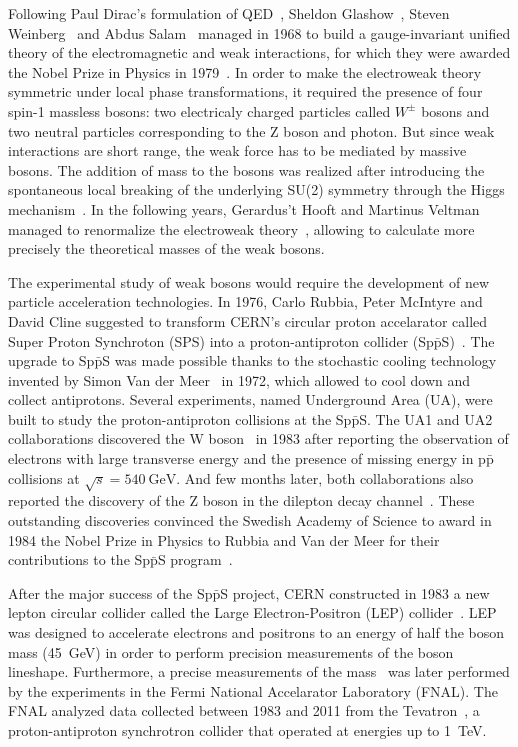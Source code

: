 Following Paul Dirac's formulation of QED~\cite{DiracQED}, Sheldon Glashow~\cite{Glashow:1959wxa}, Steven Weinberg~\cite{Weinberg:1967tq} and Abdus Salam~\cite{Salam:1968rm} managed in 1968 to build a gauge-invariant unified theory of the electromagnetic and weak interactions, for which they were awarded the Nobel Prize in Physics in 1979~\cite{Nobel1979}. In order to make the electroweak theory symmetric under local phase transformations, it required the presence of four spin-1 massless bosons: two electricaly charged particles called $W^{\pm}$ bosons and two neutral particles corresponding to the Z boson and photon. But since weak interactions are short range, the weak force has to be mediated by massive bosons. The addition of mass to the bosons was realized after introducing the spontaneous local breaking of the underlying SU(2) symmetry through the Higgs mechanism~\cite{HiggsMechanism_1,HiggsMechanism_2}. In the following years, Gerardus't Hooft and Martinus Veltman managed to renormalize the electroweak theory~\cite{Renormalization_1,Renormalization_2}, allowing to calculate more precisely the theoretical masses of the weak bosons.

The experimental study of weak bosons would require the development of new particle acceleration technologies. In 1976, Carlo Rubbia, Peter McIntyre and David Cline suggested to transform CERN's circular proton accelarator called Super Proton Synchroton (SPS) into a proton-antiproton collider (Sp$\bar{\mathrm{p}}$S)~\cite{SppS}. The upgrade to Sp$\bar{\mathrm{p}}$S was made possible thanks to the stochastic cooling technology invented by Simon Van der Meer~\cite{StochasticCooling} in 1972, which allowed to cool down and collect antiprotons. Several experiments, named Underground Area (UA), were built to study the proton-antiproton collisions at the Sp$\bar{\mathrm{p}}$S. The UA1 and UA2 collaborations discovered the W boson~\cite{W_UA1,W_UA2} in 1983 after reporting the observation of electrons with large transverse energy and the presence of missing energy in p$\bar{\mathrm{p}}$ collisions at $\sqrt{s} = \SI{540}{\GeV}$. And few months later, both collaborations also reported the discovery of the Z boson in the dilepton decay channel~\cite{Z_UA1,Z_UA2}. These outstanding discoveries convinced the Swedish Academy of Science to award in 1984 the Nobel Prize in Physics to Rubbia and Van der Meer for their contributions to the Sp$\bar{\mathrm{p}}$S program~\cite{Nobel1984}.

After the major success of the Sp$\bar{\mathrm{p}}$S project, CERN constructed in 1983 a new lepton circular collider called the Large Electron-Positron (LEP) collider~\cite{LEP}. LEP was designed to accelerate electrons and positrons to an energy of half the {\PZ} boson mass (\SI{45}{\GeV}) in order to perform precision measurements of the {\PZ} boson lineshape. Furthermore, a precise measurements of the {\PW} mass~\cite{WMass_D0} was later performed by the experiments in the Fermi National Accelarator Laboratory (FNAL). The FNAL analyzed data collected between 1983 and 2011 from the Tevatron~\cite{Tevatron}, a proton-antiproton synchrotron collider that operated at energies up to \SI{1}{\TeV}.

